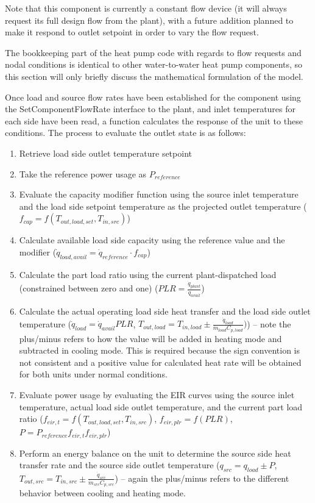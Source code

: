 Note that this component is currently a constant flow device (it will always request its full design flow from the plant), with a future addition planned to make it respond to outlet setpoint in order to vary the flow request.

The bookkeeping part of the heat pump code with regards to flow requests and nodal conditions is identical to other water-to-water heat pump components, so this section will only briefly discuss the mathematical formulation of the model.

Once load and source flow rates have been established for the component using the SetComponentFlowRate interface to the plant, and inlet temperatures for each side have been read, a function calculates the response of the unit to these conditions.  The process to evaluate the outlet state is as follows:

\begin{enumerate}
	\item Retrieve load side outlet temperature setpoint
    \item Take the reference power usage as $P_{reference}$
	\item Evaluate the capacity modifier function using the source inlet temperature and the load side setpoint temperature as the projected outlet temperature ($f_{cap} = f(T_{out,load,set}, T_{in,src}) $)
	\item Calculate available load side capacity using the reference value and the modifier ($\dot{q}_{load,avail} = \dot{q}_{reference} \cdot f_{cap}$)
	\item Calculate the part load ratio using the current plant-dispatched load (constrained between zero and one) ($PLR = \frac{\dot{q}_{plant}}{\dot{q}_{avail}}$)
	\item Calculate the actual operating load side heat transfer and the load side outlet temperature ($\dot{q}_{load} = \dot{q}_{avail}PLR$, $T_{out,load} = T_{in,load} \pm \frac{\dot{q}_{load}}{\dot{m}_{load}C_{p,load}}) $) -- note the plus/minus refers to how the value will be added in heating mode and subtracted in cooling mode.  This is required because the sign convention is not consistent and a positive value for calculated heat rate will be obtained for both units under normal conditions.
	\item Evaluate power usage by evaluating the EIR curves using the source inlet temperature, actual load side outlet temperature, and the current part load ratio ($f_{eir,t} = f(T_{out,load,set}, T_{in,src})$, $f_{eir,plr} = f(PLR)$, $P = P_{reference} f_{eir,t} f_{eir,plr}$)
	\item Perform an energy balance on the unit to determine the source side heat transfer rate and the source side outlet temperature ($q_{src} = q_{load} \pm P$, $T_{out,src} = T_{in,src} \pm \frac{\dot{q}_{src}}{\dot{m}_{src}C_{p,src}} $) -- again the plus/minus refers to the different behavior between cooling and heating mode.
\end{enumerate}


